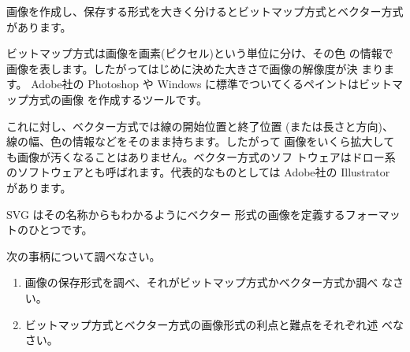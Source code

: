 画像を作成し、保存する形式を大きく分けるとビットマップ方式とベクター方式
があります。

ビットマップ方式は画像を画素(ピクセル)という単位に分け、その色
の情報で画像を表します。したがってはじめに決めた大きさで画像の解像度が決
まります。 Adobe社の
Photoshop や Windows に標準でついてくるペイントはビットマップ方式の画像
を作成するツールです。

これに対し、ベクター方式では線の開始位置と終了位置
(または長さと方向)、線の幅、色の情報などをそのまま持ちます。したがって
画像をいくら拡大しても画像が汚くなることはありません。ベクター方式のソフ
トウェアはドロー系のソフトウェアとも呼ばれます。代表的なものとしては
Adobe社の Illustrator があります。

SVG はその名称からもわかるようにベクター
形式の画像を定義するフォーマットのひとつです。

\begin{PreLearn}次の事柄について調べなさい。
\begin{enumerate}
 \item 画像の保存形式を調べ、それがビットマップ方式かベクター方式か調べ
       なさい。
 \item ビットマップ方式とベクター方式の画像形式の利点と難点をそれぞれ述
       べなさい。
\end{enumerate}
\end{PreLearn}
